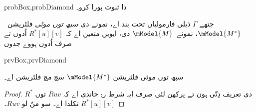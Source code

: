 \documentclass[../../../include/open-logic-section]{subfiles}
\begin{document}
\begin{probtag}{probBox,probDiamond}
   دا ثبوت پورا کرو۔
\end{probtag}

\begin{defn}
  جتھے $\Gamma$ ذیلی فارمولیاں تحت بند اے، نمونے دی \emph{سبھ توں موٹی}
  فلٹریشن~$\mModel{M^*}$، نمونے~$\mModel{M}$ دی، ایویں متعین اے کہ $R^*[u][v]$ اُدوں تے صرف اُدوں ہووے جدوں
  \begin{tagenumerate}{prvBox,prvDiamond}
  \end{tagenumerate}
\end{defn}

\begin{prop}
  سبھ توں موٹی فلٹریشن $\mModel{M^*}$ سچ مچ فلٹریشن اے۔
\end{prop}

\begin{proof}
  $R^*$ دی تعریف دِتّی ہون تے پرکھن لئی صرف ایہ شرط رہ جاندی اے کہ $Ruv$ توں $R^*[u][v]$ نکلدا اے۔ سو منّ لو
  $Ruv$۔ 
\end{proof}
\end{document}
